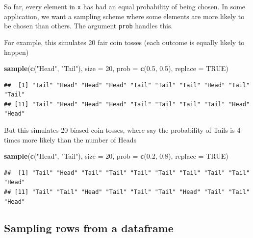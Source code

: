 \documentclass[]{book}
\newenvironment{Shaded}{\begin{snugshade}}{\end{snugshade}}
\newcommand{\KeywordTok}[1]{\textcolor[rgb]{0.13,0.29,0.53}{\textbf{#1}}}
\newcommand{\DataTypeTok}[1]{\textcolor[rgb]{0.13,0.29,0.53}{#1}}
\newcommand{\DecValTok}[1]{\textcolor[rgb]{0.00,0.00,0.81}{#1}}
\newcommand{\FloatTok}[1]{\textcolor[rgb]{0.00,0.00,0.81}{#1}}
\newcommand{\StringTok}[1]{\textcolor[rgb]{0.31,0.60,0.02}{#1}}
\newcommand{\OtherTok}[1]{\textcolor[rgb]{0.56,0.35,0.01}{#1}}
\newcommand{\NormalTok}[1]{#1}
\theoremstyle{definition}
\theoremstyle{definition}
\theoremstyle{definition}
\theoremstyle{remark}
\begin{document}
So far, every element in \texttt{x} has had an equal probability of
being chosen. In some application, we want a sampling scheme where some
elements are more likely to be chosen than others. The argument
\texttt{prob} handles this.

For example, this simulates 20 fair coin tosses (each outcome is equally
likely to happen)

\begin{Shaded}
\begin{Highlighting}[]
\KeywordTok{sample}\NormalTok{(}\KeywordTok{c}\NormalTok{(}\StringTok{"Head"}\NormalTok{, }\StringTok{"Tail"}\NormalTok{), }\DataTypeTok{size =} \DecValTok{20}\NormalTok{, }\DataTypeTok{prob =} \KeywordTok{c}\NormalTok{(}\FloatTok{0.5}\NormalTok{, }\FloatTok{0.5}\NormalTok{), }\DataTypeTok{replace =} \OtherTok{TRUE}\NormalTok{)}
\end{Highlighting}
\end{Shaded}

\begin{verbatim}
##  [1] "Tail" "Head" "Head" "Head" "Tail" "Tail" "Tail" "Head" "Tail" "Tail"
## [11] "Tail" "Head" "Head" "Head" "Tail" "Tail" "Tail" "Tail" "Head" "Head"
\end{verbatim}

But this simulates 20 biased coin tosses, where say the probability of
Tails is 4 times more likely than the number of Heads

\begin{Shaded}
\begin{Highlighting}[]
\KeywordTok{sample}\NormalTok{(}\KeywordTok{c}\NormalTok{(}\StringTok{"Head"}\NormalTok{, }\StringTok{"Tail"}\NormalTok{), }\DataTypeTok{size =} \DecValTok{20}\NormalTok{, }\DataTypeTok{prob =} \KeywordTok{c}\NormalTok{(}\FloatTok{0.2}\NormalTok{, }\FloatTok{0.8}\NormalTok{), }\DataTypeTok{replace =} \OtherTok{TRUE}\NormalTok{)}
\end{Highlighting}
\end{Shaded}

\begin{verbatim}
##  [1] "Tail" "Head" "Tail" "Tail" "Tail" "Tail" "Tail" "Tail" "Tail" "Head"
## [11] "Tail" "Tail" "Head" "Tail" "Tail" "Tail" "Head" "Tail" "Tail" "Head"
\end{verbatim}

\subsection{Sampling rows from a
dataframe}\label{sampling-rows-from-a-dataframe}
\end{document}
